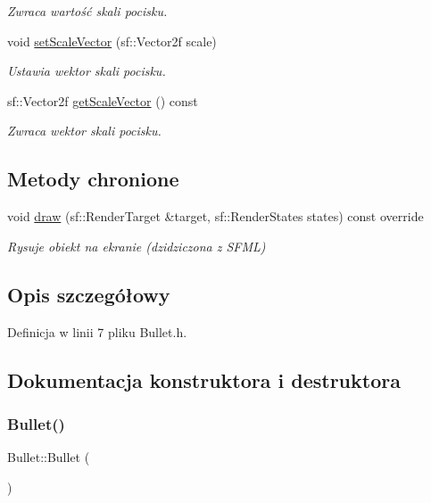 \begin{DoxyCompactItemize}
\begin{DoxyCompactList}\small\item\em Zwraca wartość skali pocisku. \end{DoxyCompactList}\item 
void \mbox{\hyperlink{class_bullet_ae6b6d87e11805a0e76f04fb7187d674e}{set\+Scale\+Vector}} (sf\+::\+Vector2f scale)
\begin{DoxyCompactList}\small\item\em Ustawia wektor skali pocisku. \end{DoxyCompactList}\item 
sf\+::\+Vector2f \mbox{\hyperlink{class_bullet_a506586cdb96da5f682ea48139627096d}{get\+Scale\+Vector}} () const
\begin{DoxyCompactList}\small\item\em Zwraca wektor skali pocisku. \end{DoxyCompactList}\end{DoxyCompactItemize}
\subsection*{Metody chronione}
\begin{DoxyCompactItemize}
\item 
void \mbox{\hyperlink{class_bullet_a36d1d889cfc8095dcd9631a766b35cf0}{draw}} (sf\+::\+Render\+Target \&target, sf\+::\+Render\+States states) const override
\begin{DoxyCompactList}\small\item\em Rysuje obiekt na ekranie (dzidziczona z S\+F\+ML) \end{DoxyCompactList}\end{DoxyCompactItemize}


\subsection{Opis szczegółowy}


Definicja w linii 7 pliku Bullet.\+h.



\subsection{Dokumentacja konstruktora i destruktora}
\mbox{\label{class_bullet_a5e8fd8844271779a2e6cf28a72b54da9}} 
\subsubsection{\texorpdfstring{Bullet()}{Bullet()}\hspace{0.1cm}{\footnotesize\ttfamily [1/2]}}
{\footnotesize\ttfamily Bullet\+::\+Bullet (\begin{DoxyParamCaption}{ }\end{DoxyParamCaption})\hspace{0.3cm}{\ttfamily [delete]}}



